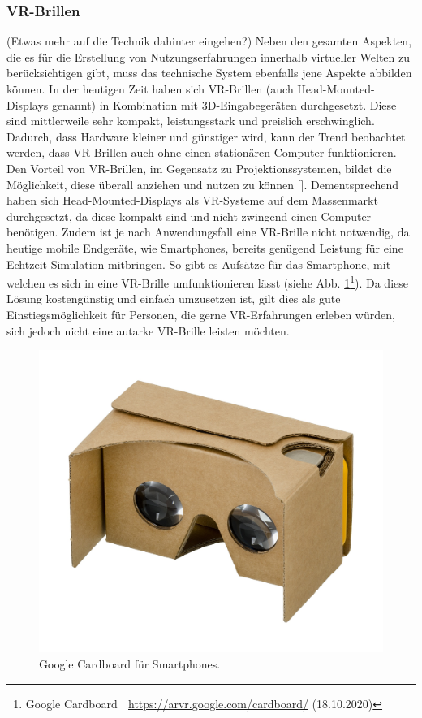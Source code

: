 \documentclass[a4paper,12pt,oneside]{article}
\begin{document}
      \subsubsection{VR-Brillen}
        (Etwas mehr auf die Technik dahinter eingehen?)
        Neben den gesamten Aspekten, die es für die Erstellung von
        Nutzungserfahrungen innerhalb virtueller Welten zu berücksichtigen gibt, 
        muss das technische System ebenfalls jene Aspekte
        abbilden können. In der heutigen Zeit haben sich VR-Brillen 
        (auch Head-Mounted-Displays genannt) in 
        Kombination mit 3D-Eingabegeräten durchgesetzt. Diese sind mittlerweile sehr kompakt,
        leistungsstark und preislich erschwinglich. Dadurch, dass Hardware kleiner
        und günstiger wird, kann der Trend beobachtet werden, dass VR-Brillen auch ohne
        einen stationären Computer funktionieren.
        Den Vorteil von VR-Brillen, im Gegensatz zu Projektionssystemen, bildet die 
        Möglichkeit, diese überall anziehen und nutzen zu können [\cite[129]{Dorner2013}].
        Dementsprechend haben sich Head-Mounted-Displays als VR-Systeme auf dem Massenmarkt
        durchgesetzt, da diese kompakt sind und nicht zwingend einen Computer benötigen.
        Zudem ist je nach Anwendungsfall eine VR-Brille nicht notwendig, da heutige 
        mobile Endgeräte, wie Smartphones, bereits genügend Leistung für eine 
        Echtzeit-Simulation mitbringen. So gibt es Aufsätze für das Smartphone,
        mit welchen es sich in eine VR-Brille umfunktionieren lässt (siehe Abb. \ref{fig:google-cardboard}\footnote{Google Cardboard | \url{https://arvr.google.com/cardboard/} (18.10.2020)}).
        Da diese Lösung kostengünstig und einfach umzusetzen ist, gilt dies als 
        gute Einstiegsmöglichkeit für Personen, die gerne
        VR-Erfahrungen erleben würden, sich jedoch nicht eine autarke VR-Brille leisten
        möchten.
        \begin{figure}[t]
          \centering
          \includegraphics{img/google-cardboard.jpg}
          \caption{Google Cardboard für Smartphones.}
          \label{fig:google-cardboard}
        \end{figure}
\end{document}
